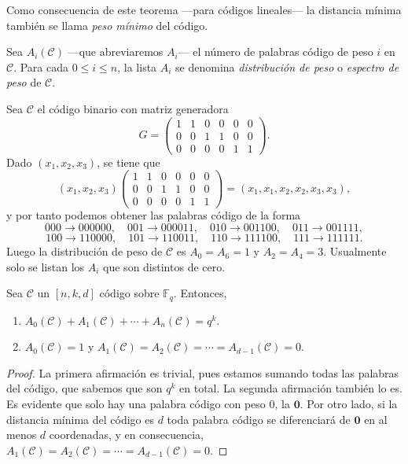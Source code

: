 Como consecuencia de este teorema —para códigos lineales— la distancia mínima también se llama \textit{peso mínimo} del código.

\begin{definition}
  Sea \(A_i(\mathcal C)\) —que abreviaremos \(A_i\)— el número de palabras código de peso \(i\) en \(\mathcal C\).
  Para cada \(0 \leq i \leq n\), la lista \(A_i\) se denomina \textit{distribución de peso} o \textit{espectro de peso} de \(\mathcal C\).
\end{definition}

\begin{example}
  Sea \(\mathcal C\) el código binario con matriz generadora
  \[
    G = \begin{pmatrix}
      1 & 1 & 0 & 0 & 0 & 0\\
      0 & 0 & 1 & 1 & 0 & 0 \\
      0 & 0 & 0 & 0 & 1 & 1
    \end{pmatrix}.
  \]
  Dado \((x_1, x_2, x_3)\), se tiene que \[(x_1, x_2, x_3) \begin{pmatrix}
    1 & 1 & 0 & 0 & 0 & 0\\
      0 & 0 & 1 & 1 & 0 & 0 \\
      0 & 0 & 0 & 0 & 1 & 1
  \end{pmatrix} = (x_1, x_1, x_2, x_2, x_3, x_3),\] y por tanto podemos obtener las palabras código de la forma 
  \[
    000 \to 000000, \!\quad 
    001 \to 000011,\!\quad 
    010 \to 001100,\!\quad 
    011 \to 001111,
  \]
  \[
    100 \to 110000, \!\quad 
    101 \to 110011,\!\quad 
    110 \to 111100,\!\quad 
    111 \to 111111.
  \]
  Luego la distribución de peso de \(\mathcal C\) es \(A_0 = A_6 = 1\) y \(A_2 = A_4 = 3\).
  Usualmente solo se listan los \(A_i\) que son distintos de cero.
\end{example}

\begin{proposition}
  Sea \(\mathcal C\) un \([n,k,d]\) código sobre \(\mathbb F_q\).
  Entonces, \begin{enumerate}
    \item \(A_0(\mathcal C) + A_1(\mathcal C) + \cdots + A_n(\mathcal C) = q^k\).
    \item \(A_0(\mathcal C) = 1\) y \(A_1(\mathcal C) = A_2(\mathcal C) = \cdots = A_{d-1}(\mathcal C) = 0\).
  \end{enumerate}
\end{proposition}

\begin{proof}
  La primera afirmación es trivial, pues estamos sumando todas las palabras del código, que sabemos que son \(q^k\) en total.
  La segunda afirmación también lo es.
  Es evidente que solo hay una palabra código con peso 0, la \(\mathbf{0}\).
  Por otro lado, si la distancia mínima del código es \(d\) toda palabra código se diferenciará de \(\mathbf{0}\) en al menos \(d\) coordenadas, y en consecuencia, \(A_1(\mathcal C) = A_2(\mathcal C) = \cdots = A_{d-1}(\mathcal C) = 0\).
\end{proof}

